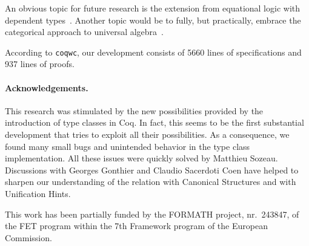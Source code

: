 \documentclass[a4paper,10pt,runningheads]{llncs}
\begin{document}
An obvious topic for future research is the extension from equational logic with dependent types~\cite{Cartmell,palmgren2007partial}. Another topic would be to fully, but practically, embrace the
categorical approach to universal algebra~\cite{pitts2001categorical}.

According to \lstinline|coqwc|, our development consists of 5660 lines of specifications and 937 lines of proofs.



\paragraph{Acknowledgements.}
This research was stimulated by the new possibilities provided by the introduction of type classes
in Coq. In fact, this seems to be the first substantial development that tries to exploit all their
possibilities. As a consequence, we found many small bugs and unintended behavior in the type
class implementation. All these issues were quickly solved by Matthieu Sozeau. Discussions with
Georges Gonthier and Claudio Sacerdoti Coen have helped to
sharpen our understanding of the relation with Canonical Structures and with Unification Hints.


This work has been partially funded by the FORMATH project, nr.\ 243847, of the FET program within the 7th Framework program of the European Commission.


\end{document}
